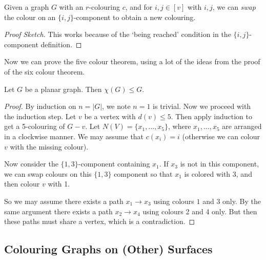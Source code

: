 \begin{proposition}
Given a graph $G$ with an $r$-colouring $c$, and for $i, j \in [v]$ with $i, j$, we can \emph{swap} the colour on an $\{i, j\}$-component to obtain a new colouring.	
\end{proposition}
\begin{proof}[Proof Sketch]
	This works because of the `being reached' condition in the $\{i, j\}$-component definition.
\end{proof}

Now we can prove the five colour theorem, using a lot of the ideas from the proof of the six colour theorem.

\begin{theorem}
	Let $G$ be a planar graph. Then $\chi(G) \leq G$.
\end{theorem}
\begin{proof}
	By induction on $n = |G|$, we note $n = 1$ is trivial.
	Now we proceed with the induction step. Let $v$ be a vertex with $d(v) \leq 5$. Then apply induction to get a 5-colouring of $G - v$. Let $N(V) = \{x_1, \dots, x_5\}$, where $x_1, \dots, x_5$ are arranged in a clockwise manner. We may assume that $c(x_i) = i$ (otherwise we can colour $v$ with the missing colour).

	Now consider the $\{1, 3\}$-component containing $x_1$. If $x_3$ is not in this component, we can swap colours on this $\{1, 3\}$ component so that $x_1$ is colored with $3$, and then colour $v$ with 1. 

	So we may assume there exists a path $x_1 \rightarrow x_3$ using colours $1$ and $3$ only. By the same argument there exists a path $x_2 \rightarrow x_4$ using colours 2 and 4 only. But then these paths must share a vertex, which is a contradiction.
\end{proof}

\subsection{Colouring Graphs on (Other) Surfaces}


